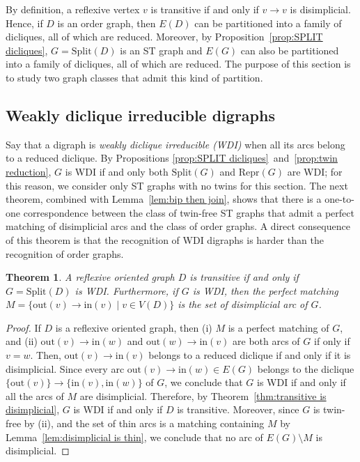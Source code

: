 \documentclass[a4paper,11pt]{article}
\newtheorem{theorem}{Theorem}
\newcommand{\SPLIT}{\ensuremath{\mathrm{Split}}}
\newcommand{\IN}{\ensuremath{\mathrm{in}}}
\newcommand{\OUT}{\ensuremath{\mathrm{out}}}
\newcommand{\REPG}{\ensuremath{\mathrm{Repr}}}
\begin{document}
By definition, a reflexive vertex $v$ is transitive if and only if $v \to v$ is disimplicial. Hence, if $D$ is an order graph, then $E(D)$ can be partitioned into a family of dicliques, all of which are reduced.  Moreover, by Proposition~\ref{prop:SPLIT dicliques}, $G = \SPLIT(D)$ is an ST graph and $E(G)$ can also be partitioned into a family of dicliques, all of which are reduced.  The purpose of this section is to study two graph classes that admit this kind of partition.

\subsection{Weakly diclique irreducible digraphs}

Say that a digraph is \emph{weakly diclique irreducible (WDI)} when all its arcs belong to a reduced diclique.  By Propositions \ref{prop:SPLIT dicliques}~and~\ref{prop:twin reduction}, $G$ is WDI if and only both $\SPLIT(G)$ and $\REPG(G)$ are WDI; for this reason, we consider only ST graphs with no twins for this section.  The next theorem, combined with Lemma~\ref{lem:bip then join}, shows that there is a one-to-one correspondence between the class of twin-free ST graphs that admit a perfect matching of disimplicial arcs and the class of order graphs.  A direct consequence of this theorem is that the recognition of WDI digraphs is harder than the recognition of order graphs.

\begin{theorem}
 A reflexive oriented graph $D$ is transitive if and only if $G = \SPLIT(D)$ is WDI.  Furthermore, if $G$ is WDI, then the perfect matching $M = \{\OUT(v) \to \IN(v) \mid v \in V(D)\}$ is the set of disimplicial arc of $G$.
\end{theorem}

\begin{proof}
 If $D$ is a reflexive oriented graph, then (i) $M$ is a perfect matching of $G$, and (ii) $\OUT(v) \to \IN(w)$ and $\OUT(w) \to \IN(v)$ are both arcs of $G$ if only if $v = w$.  Then, $\OUT(v) \to \IN(v)$ belongs to a reduced diclique if and only if it is disimplicial.  Since every arc $\OUT(v) \to \IN(w) \in E(G)$ belongs to the diclique $\{\OUT(v)\} \to \{\IN(v), \IN(w)\}$ of $G$, we conclude that $G$ is WDI if and only if all the arcs of $M$ are disimplicial.  Therefore, by Theorem~\ref{thm:transitive is disimplicial}, $G$ is WDI if and only if $D$ is transitive.  Moreover, since $G$ is twin-free by (ii), and the set of thin arcs is a matching containing $M$ by Lemma~\ref{lem:disimplicial is thin}, we conclude that no arc of $E(G) \setminus M$ is disimplicial.
\end{proof}
\end{document}
